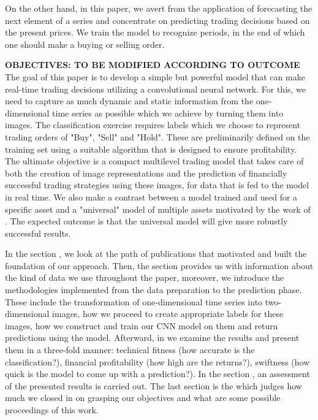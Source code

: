 \documentclass[11pt, a4paper]{article}
\begin{document}
On the other hand, in this paper, we avert from the application of forecasting the next element of a series and concentrate on predicting trading decisions based on the present prices. We train the model to recognize periods, in the end of which one should make a buying or selling order. 

\textbf{OBJECTIVES: TO BE MODIFIED ACCORDING TO OUTCOME}
The goal of this paper is to develop a simple but powerful model that can make real-time trading decisions utilizing a convolutional neural network. For this, we need to capture as much dynamic 
and static information from the one-dimensional time series as possible which we achieve by turning them into images. The classification exercise requires labels which we choose to represent trading orders of "Buy", "Sell" and "Hold". 
These are preliminarily defined on the training set using a suitable algorithm that is designed to ensure profitability. The ultimate objective is a compact multilevel trading model that takes care of both the creation of image representations and the prediction of financially successful trading strategies using these images, for data that is fed to the model in real time. We also make a contrast between a model trained and used for a specific asset and a "universal" model of multiple assets motivated by the work of \cite{sirignano2018universal}. The expected outcome is that the universal model will give more robustly successful results.

In the section , we look at the path of publications that motivated and built the foundation of our approach. Then, the section  provides us with information about the kind of data we use throughout 
the paper, moreover, we introduce the methodologies implemented from the data preparation to the prediction phase. These include the transformation of one-dimensional time series into two-dimensional images, 
how we proceed to create appropriate labels for these images, how we construct and train our CNN model on them and return predictions using the model. 
Afterward, in  we examine the results and present them in a three-fold manner:
technical fitness (how accurate is the classification?), financial profitability (how high are the returns?), swiftness (how quick is the model to come up with a prediction?). In the section , an assessment of the presented results is carried out.
The last section is the  which judges how much 
we closed in on grasping our objectives and what are some possible proceedings of this work.
\end{document}
